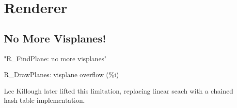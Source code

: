 \section{Renderer}

\subsection{No More Visplanes!}
"R_FindPlane: no more visplanes"\\
\par
R_DrawPlanes: visplane overflow (\%i)\\
\par

Lee Killough later lifted this limitation, replacing linear seach with a chained hash table implementation.
